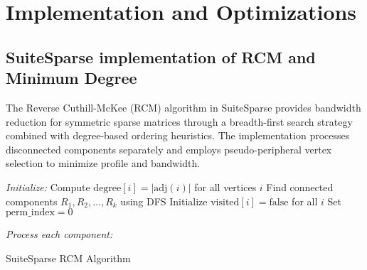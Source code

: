 \chapter{Implementation and Optimizations}
\label{ch:implementation_and_optimizations}

\section{SuiteSparse implementation of RCM and Minimum Degree}

The Reverse Cuthill-McKee (RCM) algorithm in SuiteSparse provides bandwidth reduction for symmetric sparse matrices through a breadth-first search strategy combined with degree-based ordering heuristics. The implementation processes disconnected components separately and employs pseudo-peripheral vertex selection to minimize profile and bandwidth.

\begin{algorithm}
    
    \BlankLine
    
    \emph{Initialize:}\;
    Compute $\text{degree}[i] = |\text{adj}(i)|$ for all vertices $i$\;
    Find connected components $R_1, R_2, \ldots, R_k$ using DFS\;
    Initialize $\text{visited}[i] = \text{false}$ for all $i$\;
    Set $\text{perm\_index} = 0$\;
    \BlankLine
    
    \emph{Process each component:}\;
    
    \;
    
    \caption{SuiteSparse RCM Algorithm}
    \label{alg:rcm}
\end{algorithm}

